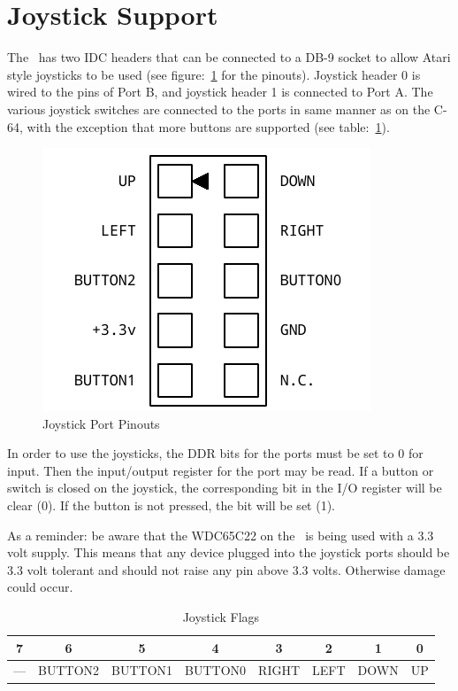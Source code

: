 \section*{Joystick Support}

The \jr\ has two IDC headers that can be connected to a DB-9 socket to allow Atari style joysticks to be used (see figure:~\ref{fig:joystick_ports} for the pinouts). Joystick header 0 is wired to the pins of Port B, and joystick header 1 is connected to Port A. The various joystick switches are connected to the ports in same manner as on the C-64, with the exception that more buttons are supported (see table:~\ref{tab:via_joystick}).

\begin{figure}[ht]
    \begin{center}
        \includegraphics[scale=0.65]{images/f256_port_joystick.pdf}
    \end{center}
    \caption{Joystick Port Pinouts}
    \label{fig:joystick_ports}
\end{figure}

In order to use the joysticks, the DDR bits for the ports must be set to 0 for input. Then the input/output register for the port may be read. If a button or switch is closed on the joystick, the corresponding bit in the I/O register will be clear (0). If the button is not pressed, the bit will be set (1).

As a reminder: be aware that the WDC65C22 on the \jr\ is being used with a 3.3 volt supply. This means that any device plugged into the joystick ports should be 3.3 volt tolerant and should not raise any pin above 3.3 volts. Otherwise damage could occur.

\begin{table}[ht]
    \begin{center}
        \begin{tabular}{|c|c|c|c|c|c|c|c|} \hline
            7 & 6 & 5 & 4 & 3 & 2 & 1 & 0 \\\hline\hline
            --- & BUTTON2 & BUTTON1 & BUTTON0 & RIGHT & LEFT & DOWN & UP \\ \hline
        \end{tabular}
    \end{center}
    \caption{Joystick Flags}
    \label{tab:via_joystick}
\end{table}

